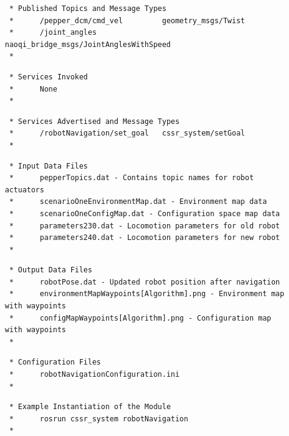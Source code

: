\documentclass{CSSRforAfrica}
\newcommand{\checkboxChecked}{\fbox{\ding{51}}} %
\begin{document}
\begin{description}
\item[\checkboxChecked] 
 {\small 
\begin{verbatim}                    
 * Published Topics and Message Types
 *      /pepper_dcm/cmd_vel         geometry_msgs/Twist
 *      /joint_angles               naoqi_bridge_msgs/JointAnglesWithSpeed
 *
\end{verbatim}}

\item[\checkboxChecked]
 {\small 
\begin{verbatim}                    
 * Services Invoked
 *      None
 *
\end{verbatim}}

\item[\checkboxChecked]
 {\small 
\begin{verbatim}                    
 * Services Advertised and Message Types
 *      /robotNavigation/set_goal   cssr_system/setGoal
 *
\end{verbatim}}

\item[\checkboxChecked] 
 {\small 
\begin{verbatim}
 * Input Data Files
 *      pepperTopics.dat - Contains topic names for robot actuators
 *      scenarioOneEnvironmentMap.dat - Environment map data
 *      scenarioOneConfigMap.dat - Configuration space map data
 *      parameters230.dat - Locomotion parameters for old robot
 *      parameters240.dat - Locomotion parameters for new robot
 *
\end{verbatim}}

\item[\checkboxChecked] 
 {\small 
\begin{verbatim}
 * Output Data Files
 *      robotPose.dat - Updated robot position after navigation
 *      environmentMapWaypoints[Algorithm].png - Environment map with waypoints
 *      configMapWaypoints[Algorithm].png - Configuration map with waypoints
 *
\end{verbatim}}

\item[\checkboxChecked] 
 {\small 
\begin{verbatim}
 * Configuration Files
 *      robotNavigationConfiguration.ini
 *
\end{verbatim}}

\item[\checkboxChecked] 
 {\small 
\begin{verbatim}
 * Example Instantiation of the Module
 *      rosrun cssr_system robotNavigation
 *
\end{verbatim}}


\end{description}
\end{document}
